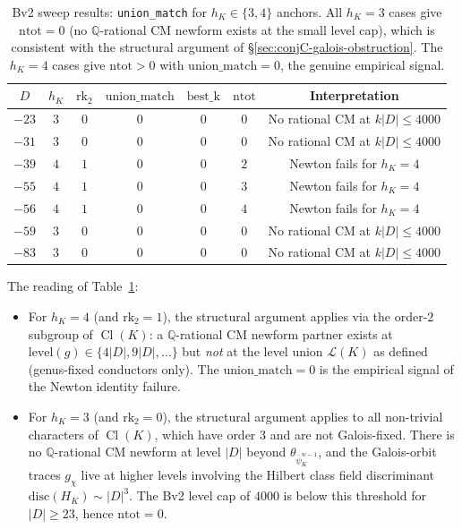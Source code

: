 \documentclass[11pt,a4paper]{amsart}
\theoremstyle{definition}
\DeclareMathOperator{\Cl}{Cl}
\newcommand{\Q}{\mathbb{Q}}
\newcommand{\Lcal}{\mathcal{L}}
\newcommand{\hK}{h_{K}}
\begin{document}
\begin{table}[h]
\centering
\caption{Bv2 sweep results: \texttt{union\_match} for $\hK \in \{3, 4\}$ anchors. All $\hK = 3$ cases give $\mathrm{ntot} = 0$ (no $\Q$-rational CM newform exists at the small level cap), which is consistent with the structural argument of \S\ref{sec:conjC-galois-obstruction}. The $\hK = 4$ cases give $\mathrm{ntot} > 0$ with $\mathrm{union\_match} = 0$, the genuine empirical signal.}
\label{tab:Bv2-results}
\begin{tabular}{ccccccc}
\toprule
$D$ & $\hK$ & $\mathrm{rk}_2$ & $\mathrm{union\_match}$ & $\mathrm{best\_k}$ & $\mathrm{ntot}$ & Interpretation \\
\midrule
$-23$ & $3$ & $0$ & $0$ & $0$ & $0$ & No rational CM at $k|D| \le 4000$ \\
$-31$ & $3$ & $0$ & $0$ & $0$ & $0$ & No rational CM at $k|D| \le 4000$ \\
$-39$ & $4$ & $1$ & $0$ & $0$ & $2$ & Newton fails for $\hK = 4$ \\
$-55$ & $4$ & $1$ & $0$ & $0$ & $3$ & Newton fails for $\hK = 4$ \\
$-56$ & $4$ & $1$ & $0$ & $0$ & $4$ & Newton fails for $\hK = 4$ \\
$-59$ & $3$ & $0$ & $0$ & $0$ & $0$ & No rational CM at $k|D| \le 4000$ \\
$-83$ & $3$ & $0$ & $0$ & $0$ & $0$ & No rational CM at $k|D| \le 4000$ \\
\bottomrule
\end{tabular}
\end{table}

The reading of Table~\ref{tab:Bv2-results}:
\begin{itemize}[leftmargin=2em]
  \item For $\hK = 4$ (and $\mathrm{rk}_2 = 1$), the structural argument applies via the order-$2$ subgroup of $\Cl(K)$: a $\Q$-rational CM newform partner exists at $\mathrm{level}(g) \in \{4|D|, 9|D|, \ldots\}$ but \emph{not} at the level union $\Lcal(K)$ as defined (genus-fixed conductors only). The $\mathrm{union\_match} = 0$ is the empirical signal of the Newton identity failure.
  \item For $\hK = 3$ (and $\mathrm{rk}_2 = 0$), the structural argument applies to all non-trivial characters of $\Cl(K)$, which have order $3$ and are not Galois-fixed. There is no $\Q$-rational CM newform at level $|D|$ beyond $\theta_{\bar\psi_K^{w-1}}$, and the Galois-orbit traces $g_\chi$ live at higher levels involving the Hilbert class field discriminant $\mathrm{disc}(H_K) \sim |D|^3$. The Bv2 level cap of $4000$ is below this threshold for $|D| \ge 23$, hence $\mathrm{ntot} = 0$.
\end{itemize}
\end{document}
